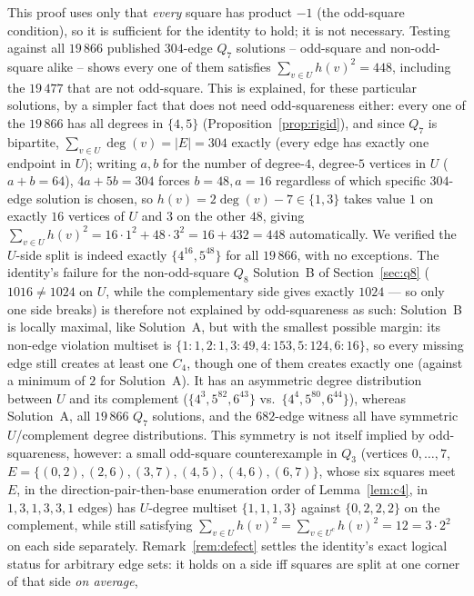 \documentclass[12pt]{article}
\begin{document}
This proof uses only that \emph{every} square has product $-1$ (the
odd-square condition), so it is sufficient for the identity to hold; it
is not necessary. Testing against all $19\,866$ published $304$-edge
$Q_7$ solutions -- odd-square and non-odd-square alike -- shows every
one of them satisfies $\sum_{v\in U}h(v)^2=448$, including the
$19\,477$ that are not odd-square. This is explained, for these
particular solutions, by a simpler fact that does not need
odd-squareness either: every one of the $19\,866$ has all degrees in
$\{4,5\}$ (Proposition~\ref{prop:rigid}), and since $Q_7$ is bipartite,
$\sum_{v\in U}\deg(v)=|E|=304$ exactly (every edge has exactly one
endpoint in $U$); writing $a,b$ for the number of degree-$4$,
degree-$5$ vertices in $U$ ($a+b=64$), $4a+5b=304$ forces $b=48,a=16$
regardless of which specific $304$-edge solution is chosen, so
$h(v)=2\deg(v)-7\in\{1,3\}$ takes value $1$ on exactly $16$ vertices of
$U$ and $3$ on the other $48$, giving
$\sum_{v\in U}h(v)^2=16\cdot1^2+48\cdot3^2=16+432=448$ automatically.
We verified the $U$-side split is indeed exactly $\{4^{16},5^{48}\}$
for all $19\,866$, with no exceptions. The identity's failure for the
non-odd-square $Q_8$ Solution~B of Section~\ref{sec:q8} ($1016\ne1024$ on
$U$, while the complementary side gives exactly $1024$ --- so only one side
breaks)
is therefore not explained by odd-squareness as such: Solution~B is locally maximal, like Solution~A, but with the smallest possible
margin: its non-edge violation multiset is
$\{1{:}1,2{:}1,3{:}49,4{:}153,5{:}124,6{:}16\}$, so every missing edge still
creates at least one $C_4$, though one of them creates exactly one (against a
minimum of $2$ for Solution~A). It has an
asymmetric degree distribution between $U$ and its complement
($\{4^3,5^{82},6^{43}\}$ vs.\ $\{4^4,5^{80},6^{44}\}$), whereas
Solution~A, all $19\,866$ $Q_7$ solutions, and the $682$-edge witness all
have symmetric $U$/complement degree distributions. This symmetry is
not itself implied by odd-squareness, however: a small odd-square
counterexample in $Q_3$ (vertices $0,\ldots,7$,
$E=\{(0,2),(2,6),(3,7),(4,5),(4,6),(6,7)\}$, whose six squares meet $E$,
in the direction-pair-then-base enumeration order of Lemma~\ref{lem:c4},
in $1,3,1,3,3,1$ edges) has $U$-degree multiset $\{1,1,1,3\}$ against
$\{0,2,2,2\}$ on the complement, while still satisfying
$\sum_{v\in U}h(v)^2=\sum_{v\in U^c}h(v)^2=12=3\cdot2^2$ on each side
separately. Remark~\ref{rem:defect} settles the identity's exact
logical status for arbitrary edge sets: it holds on a side iff squares are
split at one corner of that side \emph{on average},
\end{document}
